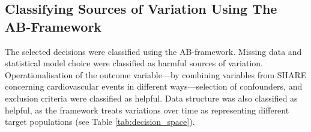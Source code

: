 \documentclass[
  man,
  floatsintext,
  longtable,
  nolmodern,
  notxfonts,
  notimes,
  colorlinks=true,linkcolor=blue,citecolor=blue,urlcolor=blue]{apa7}
\begin{document}
\subsection{Classifying Sources of Variation Using The
AB-Framework}\label{classifying-sources-of-variation-using-the-ab-framework}

The selected decisions were classified using the AB-framework. Missing
data and statistical model choice were classified as harmful sources of
variation. Operationalisation of the outcome variable---by combining
variables from SHARE concerning cardiovascular events in different
ways---selection of confounders, and exclusion criteria were classified
as helpful. Data structure was also classified as helpful, as the
framework treats variations over time as representing different target
populations (see Table \ref{tab:decision_space}).
\end{document}
